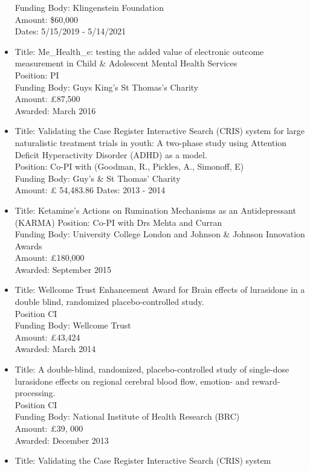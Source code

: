 \documentclass[
]{article}
\begin{document}
\begin{itemize}
  Funding Body: Klingenstein Foundation\\
  Amount: \$60,000\\
  Dates: 5/15/2019 - 5/14/2021
\item
  Title: Me\_Health\_e: testing the added value of electronic outcome
  measurement in Child \& Adolescent Mental Health Services\\
  Position: PI\\
  Funding Body: Guys King's St Thomas's Charity\\
  Amount: £87,500\\
  Awarded: March 2016
\item
  Title: Validating the Case Register Interactive Search (CRIS) system
  for large naturalistic treatment trials in youth: A two-phase study
  using Attention Deficit Hyperactivity Disorder (ADHD) as a model.\\
  Position: Co-PI with (Goodman, R., Pickles, A., Simonoff, E)\\
  Funding Body: Guy's \& St Thomas' Charity\\
  Amount: £ 54,483.86 Dates: 2013 - 2014
\item
  Title: Ketamine's Actions on Rumination Mechanisms as an
  Antidepressant (KARMA) Position: Co-PI with Drs Mehta and Curran\\
  Funding Body: University College London and Johnson \& Johnson
  Innovation Awards\\
  Amount: £180,000\\
  Awarded: September 2015
\item
  Title: Wellcome Trust Enhancement Award for Brain effects of
  lurasidone in a double blind, randomized placebo-controlled study.\\
  Position CI\\
  Funding Body: Wellcome Trust\\
  Amount: £43,424\\
  Awarded: March 2014
\item
  Title: A double-blind, randomized, placebo-controlled study of
  single-dose lurasidone effects on regional cerebral blood flow,
  emotion- and reward-processing.\\
  Position CI\\
  Funding Body: National Institute of Health Research (BRC)\\
  Amount: £39, 000\\
  Awarded: December 2013
\item
  Title: Validating the Case Register Interactive Search (CRIS) system

\end{itemize}
\end{document}
